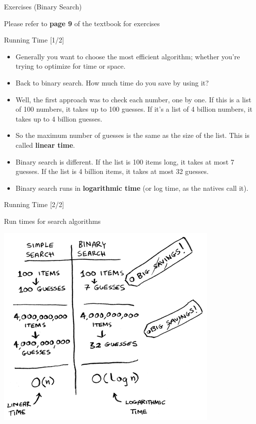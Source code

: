 \documentclass[ignorenonframetext,]{beamer}
\providecommand{\tightlist}{%
  \setlength{\itemsep}{0pt}\setlength{\parskip}{0pt}}
\begin{document}
\begin{frame}{Exercises (Binary Search)}
\protect\hypertarget{exercises-binary-search}{}

Please refer to \textbf{page 9} of the textbook for exercises

\end{frame}

\begin{frame}{Running Time {[}1/2{]}}
\protect\hypertarget{running-time-12}{}

\begin{itemize}
\tightlist
\item
  Generally you want to choose the most efficient algorithm; whether
  you're trying to optimize for time or space.
\item
  Back to binary search. How much time do you save by using it?
\item
  Well, the first approach was to check each number, one by one. If this
  is a list of 100 numbers, it takes up to 100 guesses. If it's a list
  of 4 billion numbers, it takes up to 4 billion guesses.
\item
  So the maximum number of guesses is the same as the size of the list.
  This is called \textbf{linear time}.
\item
  Binary search is different. If the list is 100 items long, it takes at
  most 7 guesses. If the list is 4 billion items, it takes at most 32
  guesses.
\item
  Binary search runs in \textbf{logarithmic time} (or log time, as the
  natives call it).
\end{itemize}

\end{frame}

\begin{frame}{Running Time {[}2/2{]}}
\protect\hypertarget{running-time-22}{}

Run times for search algorithms

\includegraphics{./Chapter01-figure/running_time.png}

\end{frame}
\end{document}

